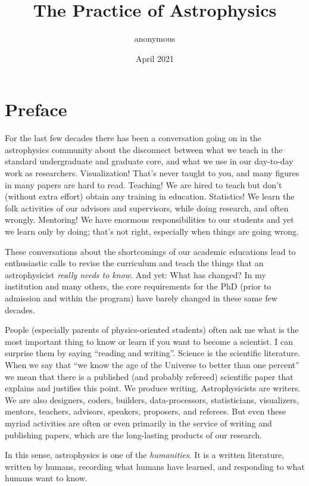 \documentclass[letterpaper]{book}
\title{\textbf{The Practice of Astrophysics}}
\author{anonymous}
\date{April 2021}
\newcommand{\chaptermarkstar}[1]{\markboth{#1}{#1}}
\begin{document}
\maketitle

\cleardoublepage
\tableofcontents

\chapter*{Preface}%
\chaptermarkstar{Preface}

For the last few decades there has been a conversation going on in the astrophysics community about the disconnect between what we teach in the standard undergraduate and graduate core, and what we use in our day-to-day work as researchers.
Visualization! That's never taught to you, and many figures in many papers are hard to read.
Teaching! We are hired to teach but don't (without extra effort) obtain any training in education.
Statistics! We learn the folk activities of our advisors and supervisors, while doing research, and often wrongly.
Mentoring! We have enormous responsibilities to our students and yet we learn only by doing; that's not right, especially when things are going wrong.

These conversations about the shortcomings of our academic educations lead to enthusiastic calls to revise the curriculum and teach the things that an astrophysicist \emph{really needs to know}.
And yet: What has changed? In my institution and many others, the core requirements for the PhD (prior to admission and within the program) have barely changed in these same few decades.

People (especially parents of physics-oriented students) often ask me what is the most important thing to know or learn if you want to become a scientist.
I can surprise them by saying ``reading and writing''.
Science is the scientific literature.
When we say that ``we know the age of the Universe to better than one percent'' we mean that there is a published (and probably refereed) scientific paper that explains and justifies this point.
We produce writing.
Astrophysicists are writers.
We are also designers, coders, builders, data-processors, statisticians, visualizers, mentors, teachers, advisors, speakers, proposers, and referees.
But even these myriad activities are often or even primarily in the service of writing and publishing papers, which are the long-lasting products of our research.

In this sense, astrophysics is one of the \emph{humanities}.
It is a written literature, written by humans, recording what humans have learned, and responding to what humans want to know.
\end{document}
